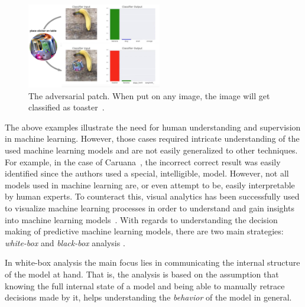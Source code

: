 \begin{figure}
\centering
\includegraphics[height=10em]{tex/introduction/adversarialtoaster.png}
\caption[The adversarial patch.]{
The adversarial patch. When put on any image, the image will get classified as toaster~\cite{2017arXiv171209665B}.
}
\label{figs:toaster}
\end{figure}

The above examples illustrate the need for human understanding and supervision in machine learning.
However, those cases required intricate understanding of the used machine learning models and are not easily generalized to other techniques.
For example, in the case of Caruana~\etal\cite{Caruana:2015:IMH:2783258.2788613}, the incorrect correct result was easily identified since the authors used a special, intelligible, model.
However, not all models used in machine learning are, or even attempt to be, easily interpretable by human experts.
To counteract this, visual analytics has been successfully used to visualize machine learning processes in order to understand and gain insights into machine learning models~\cite{DBLP:journals/corr/StrobeltGHPR16,DBLP:journals/corr/abs-1710-06501,2017arXiv170401942K,DBLP:journals/corr/abs-1710-10777,8019879,8019872,DBLP:journals/tvcg/LiuXLWWZ18,8019878}. 
With regards to understanding the decision making of predictive machine learning models, there are two main strategies: \emph{white-box} and \emph{black-box} analysis \cite{class_signatures}.

In white-box analysis the main focus lies in communicating the internal structure of the model at hand. That is, the analysis is based on the assumption that knowing the full internal state of a model and being able to manually retrace decisions made by it, helps understanding the \emph{behavior} of the model in general.

